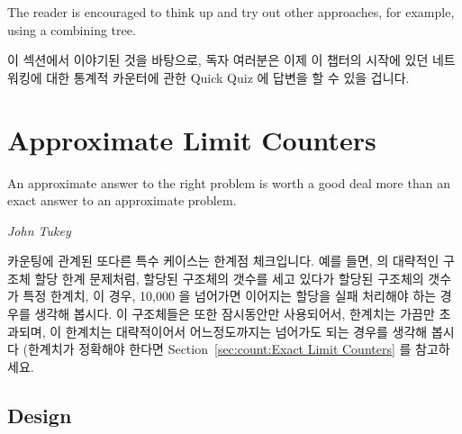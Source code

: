\begin{lineref}
{	The reader is encouraged to think up and try out other approaches,
	for example, using a combining tree.
	\fi
} \QuickQuizEnd

이 섹션에서 이야기된 것을 바탕으로, 독자 여러분은 이제 이 챕터의 시작에 있던
네트워킹에 대한 통계적 카운터에 관한 Quick Quiz 에 답변을 할 수 있을 겁니다.

\section{Approximate Limit Counters}
\label{sec:count:Approximate Limit Counters}
%
\epigraph{An approximate answer to the right problem is worth a good deal
	  more than an exact answer to an approximate problem.}
	 {\emph{John Tukey}}

카운팅에 관계된 또다른 특수 케이스는 한계점 체크입니다.
예를 들면, {\QcountQapproxcnt} 의 대략적인 구조체 할당 한계 문제처럼, 할당된
구조체의 갯수를 세고 있다가 할당된 구조체의 갯수가 특정 한계치, 이 경우, 10,000
을 넘어가면 이어지는 할당을 실패 처리해야 하는 경우를 생각해 봅시다.
이 구조체들은 또한 잠시동안만 사용되어서, 한계치는 가끔만 초과되며, 이 한계치는
대략적이어서 어느정도까지는 넘어가도 되는 경우를 생각해 봅시다 (한계치가
정확해야 한다면 Section~\ref{sec:count:Exact Limit Counters} 를 참고하세요.

\subsection{Design}


\end{lineref}
